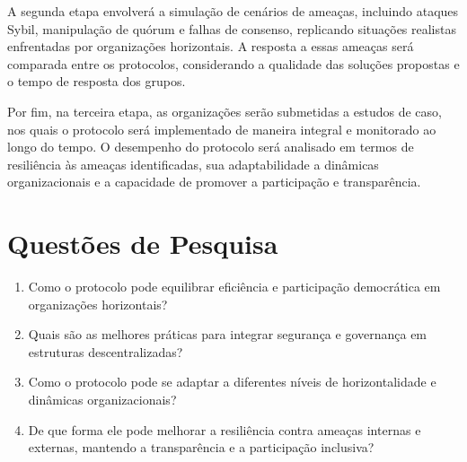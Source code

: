 A segunda etapa envolverá a simulação de cenários de ameaças, incluindo ataques
Sybil, manipulação de quórum e falhas de consenso, replicando situações
realistas enfrentadas por organizações horizontais. A resposta a essas ameaças
será comparada entre os protocolos, considerando a qualidade das soluções
propostas e o tempo de resposta dos grupos.

Por fim, na terceira etapa, as organizações serão submetidas a estudos de caso,
nos quais o protocolo será implementado de maneira integral e monitorado ao
longo do tempo. O desempenho do protocolo será analisado em termos de
resiliência às ameaças identificadas, sua adaptabilidade a dinâmicas
organizacionais e a capacidade de promover a participação e transparência.

\section{Questões de Pesquisa}
\label{sec:research_questions}

\begin{enumerate}
    \item Como o protocolo pode equilibrar eficiência e participação
democrática em organizações horizontais?
    \item Quais são as melhores práticas para integrar segurança e
governança em estruturas descentralizadas?
    \item Como o protocolo pode se adaptar a diferentes níveis de
horizontalidade e dinâmicas organizacionais?
    \item De que forma ele pode melhorar a resiliência contra ameaças
internas e externas, mantendo a transparência e a participação
inclusiva?
\end{enumerate}

